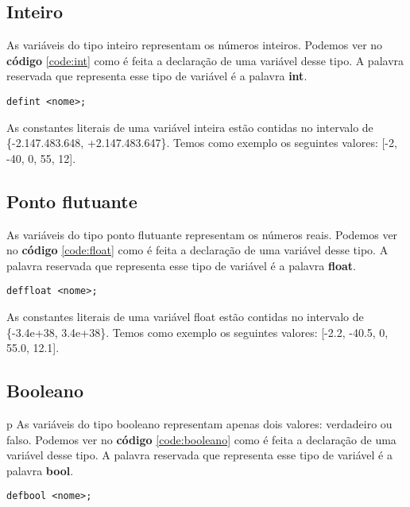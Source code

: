 \documentclass[
  12pt,				%
  oneside,			%
  a4paper,			%
  english,			%
  french,				%
  spanish,			%
  brazil,				%
]{abntex2}
\begin{document}
\subsection{Inteiro}
\label{subsec:inteiro}
As variáveis do tipo inteiro representam os números inteiros. Podemos
ver no \textbf{código} \ref{code:int} como é feita a declaração de uma
variável desse tipo. A palavra reservada que representa esse tipo de
variável é a palavra \textbf{int}.

\begin{lstlisting}[label=code:int,caption=Declaração de uma variável inteira]
  defint <nome>;
\end{lstlisting}


As constantes literais de uma variável inteira estão contidas no
intervalo de
\\
\{-2.147.483.648, +2.147.483.647\}. Temos como exemplo
os seguintes valores: [-2, -40, 0, 55, 12].

\subsection{Ponto flutuante}
\label{subsec:ponto-flutuante}
As variáveis do tipo ponto flutuante representam os números
reais. Podemos ver no \textbf{código} \ref{code:float} como
é feita a declaração de uma variável desse tipo. A palavra reservada
que representa esse tipo de variável é a palavra \textbf{float}.

\begin{lstlisting}[label=code:float,caption=Declaração de uma variável
  tipo ponto flutuante.]
  deffloat <nome>;
\end{lstlisting}

As constantes literais de uma variável float estão contidas no
intervalo de
\\
\{-3.4e+38, 3.4e+38\}. Temos como exemplo
os seguintes valores: [-2.2, -40.5, 0, 55.0, 12.1].

\subsection{Booleano}
\label{subsec:booleano}
p
As variáveis do tipo booleano representam apenas dois
valores: verdadeiro ou falso. Podemos ver no \textbf{código}
\ref{code:booleano} como é feita a declaração de uma variável desse
tipo. A palavra reservada que representa esse tipo de variável é a palavra \textbf{bool}.

\begin{lstlisting}[label=code:booleano,caption=Declaração de uma variável booleana]
  defbool <nome>;
\end{lstlisting}
\end{document}
